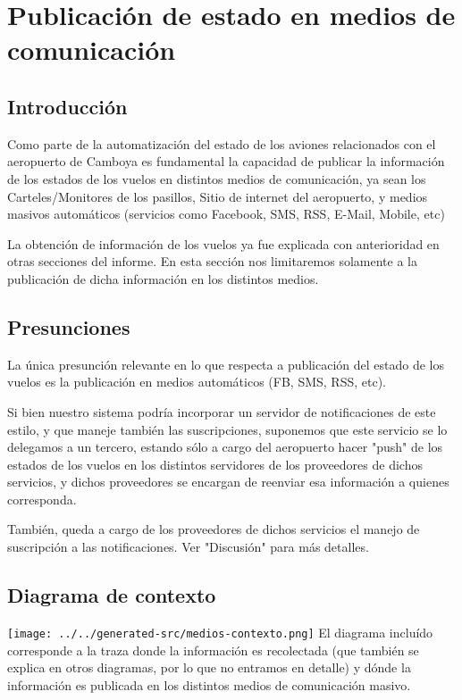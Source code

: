 \section{Publicación de estado en medios de comunicación}
\subsection{Introducción}
Como parte de la automatización del estado de los aviones relacionados con el aeropuerto de Camboya es fundamental la capacidad de publicar la información de los estados de los vuelos en distintos medios de comunicación, ya sean los Carteles/Monitores de los pasillos, Sitio de internet del aeropuerto, y medios masivos automáticos (servicios como Facebook, SMS, RSS, E-Mail, Mobile, etc)

La obtención de información de los vuelos ya fue explicada con anterioridad en otras secciones del informe. En esta sección nos limitaremos solamente a la publicación de dicha información en los distintos medios.

\subsection{Presunciones}
La única presunción relevante en lo que respecta a publicación del estado de los vuelos es la publicación en medios automáticos (FB, SMS, RSS, etc).

Si bien nuestro sistema podría incorporar un servidor de notificaciones de este estilo, y que maneje también las suscripciones, suponemos que este servicio se lo delegamos a un tercero, estando sólo a cargo del aeropuerto hacer "push" de los estados de los vuelos en los distintos servidores de los proveedores de dichos servicios, y dichos proveedores se encargan de reenviar esa información a quienes corresponda.

También, queda a cargo de los proveedores de dichos servicios el manejo de suscripción a las notificaciones. Ver "Discusión" para más detalles. 

\subsection{Diagrama de contexto}
\texttt{[image: ../../generated-src/medios-contexto.png]}
El diagrama incluído corresponde a la traza donde la información es recolectada (que también se explica en otros diagramas, por lo que no entramos en detalle) y dónde la información es publicada en los distintos medios de comunicación masivo.

